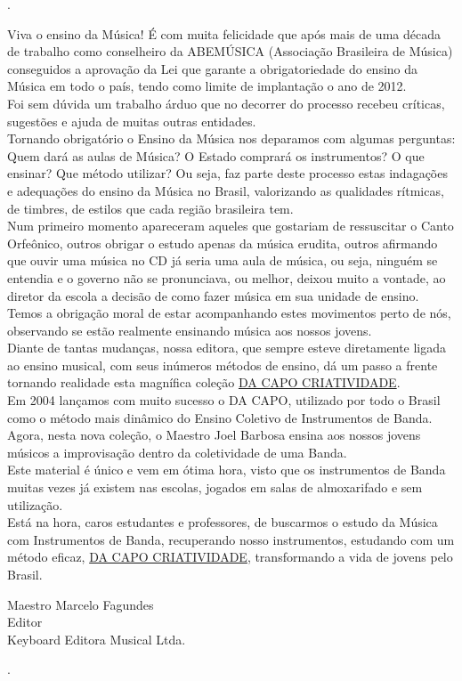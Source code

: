 \tiny{.} \normalsize

Viva o ensino da Música! É com muita felicidade que após mais
de uma década de trabalho como conselheiro da ABEMÚSICA (Associação
Brasileira de Música) conseguidos a aprovação da Lei que garante a
obrigatoriedade do ensino da Música em todo o país, tendo como limite
de implantação o ano de 2012.\\


Foi sem dúvida um trabalho árduo que no decorrer do processo recebeu
críticas, sugestões e ajuda de muitas outras entidades.\\


Tornando obrigatório o Ensino da Música nos deparamos com algumas
perguntas: Quem dará as aulas de Música? O Estado comprará os
instrumentos? O que ensinar? Que método utilizar? Ou seja, faz parte
deste processo estas indagações e adequações do ensino da Música no
Brasil, valorizando as qualidades rítmicas, de timbres, de estilos que
cada região brasileira tem.\\


Num primeiro momento apareceram aqueles que gostariam de ressuscitar o
Canto Orfeônico, outros obrigar o estudo apenas da música erudita,
outros afirmando que ouvir uma música no CD já seria uma aula de
música, ou seja, ninguém se entendia e o governo não se pronunciava,
ou melhor, deixou muito a vontade, ao diretor da escola a decisão de
como fazer música em sua unidade de ensino. Temos a obrigação moral de
estar acompanhando estes movimentos perto de nós, observando se estão
realmente ensinando música aos nossos jovens.\\


Diante de tantas mudanças, nossa editora, que sempre esteve
diretamente ligada ao ensino musical, com seus inúmeros métodos de
ensino, dá um passo a frente tornando realidade esta magnífica coleção
\underline{DA CAPO CRIATIVIDADE}.\\


Em 2004 lançamos com muito sucesso o DA CAPO, utilizado por todo o
Brasil como o método mais dinâmico do Ensino Coletivo de Instrumentos
de Banda. Agora, nesta nova coleção, o Maestro Joel Barbosa ensina aos
nossos jovens músicos a improvisação dentro da coletividade de uma
Banda.\\


Este material é único e vem em ótima hora, visto que os instrumentos
de Banda muitas vezes já existem nas escolas, jogados em salas de
almoxarifado e sem utilização.\\


Está na hora, caros estudantes e professores, de buscarmos o estudo da
Música com Instrumentos de Banda, recuperando nosso instrumentos,
estudando com um método eficaz, \underline{DA CAPO CRIATIVIDADE},
transformando a
vida de jovens pelo Brasil.\\



\begin{flushleft}
  Maestro Marcelo Fagundes\\
  Editor\\
  Keyboard Editora Musical Ltda.\\
\end{flushleft}
\break
\tiny{.} \normalsize
